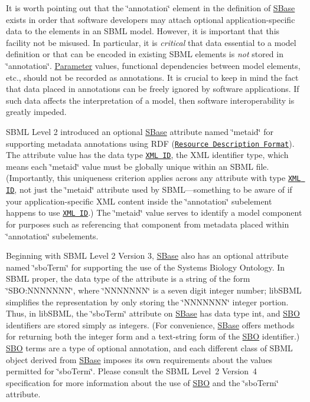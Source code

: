 It is worth pointing out that the \char`\"{}annotation\char`\"{} element in the definition of \hyperlink{class_s_base}{S\+Base} exists in order that software developers may attach optional application-\/specific data to the elements in an S\+B\+ML model. However, it is important that this facility not be misused. In particular, it is {\itshape critical} that data essential to a model definition or that can be encoded in existing S\+B\+ML elements is {\itshape not} stored in \char`\"{}annotation\char`\"{}. \hyperlink{class_parameter}{Parameter} values, functional dependencies between model elements, etc., should not be recorded as annotations. It is crucial to keep in mind the fact that data placed in annotations can be freely ignored by software applications. If such data affects the interpretation of a model, then software interoperability is greatly impeded.

S\+B\+ML Level 2 introduced an optional \hyperlink{class_s_base}{S\+Base} attribute named \char`\"{}metaid\char`\"{} for supporting metadata annotations using R\+DF (\href{http://www.w3.org/RDF/}{\tt Resource Description Format}). The attribute value has the data type \href{http://www.w3.org/TR/REC-xml/#id}{\tt X\+ML ID}, the X\+ML identifier type, which means each \char`\"{}metaid\char`\"{} value must be globally unique within an S\+B\+ML file. (Importantly, this uniqueness criterion applies across any attribute with type \href{http://www.w3.org/TR/REC-xml/#id}{\tt X\+ML ID}, not just the \char`\"{}metaid\char`\"{} attribute used by S\+B\+ML---something to be aware of if your application-\/specific X\+ML content inside the \char`\"{}annotation\char`\"{} subelement happens to use \href{http://www.w3.org/TR/REC-xml/#id}{\tt X\+ML ID}.) The \char`\"{}metaid\char`\"{} value serves to identify a model component for purposes such as referencing that component from metadata placed within \char`\"{}annotation\char`\"{} subelements.

Beginning with S\+B\+ML Level 2 Version 3, \hyperlink{class_s_base}{S\+Base} also has an optional attribute named \char`\"{}sbo\+Term\char`\"{} for supporting the use of the Systems Biology Ontology. In S\+B\+ML proper, the data type of the attribute is a string of the form \char`\"{}\+S\+B\+O\+:\+N\+N\+N\+N\+N\+N\+N\char`\"{}, where \char`\"{}\+N\+N\+N\+N\+N\+N\+N\char`\"{} is a seven digit integer number; lib\+S\+B\+ML simplifies the representation by only storing the \char`\"{}\+N\+N\+N\+N\+N\+N\+N\char`\"{} integer portion. Thus, in lib\+S\+B\+ML, the \char`\"{}sbo\+Term\char`\"{} attribute on \hyperlink{class_s_base}{S\+Base} has data type {\ttfamily int}, and \hyperlink{class_s_b_o}{S\+BO} identifiers are stored simply as integers. (For convenience, \hyperlink{class_s_base}{S\+Base} offers methods for returning both the integer form and a text-\/string form of the \hyperlink{class_s_b_o}{S\+BO} identifier.) \hyperlink{class_s_b_o}{S\+BO} terms are a type of optional annotation, and each different class of S\+B\+ML object derived from \hyperlink{class_s_base}{S\+Base} imposes its own requirements about the values permitted for \char`\"{}sbo\+Term\char`\"{}. Please consult the S\+B\+ML Level~2 Version~4 specification for more information about the use of \hyperlink{class_s_b_o}{S\+BO} and the \char`\"{}sbo\+Term\char`\"{} attribute.

